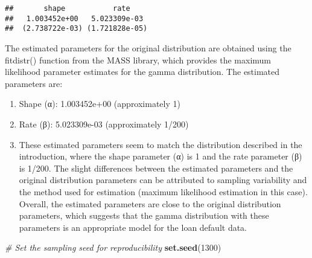 \documentclass[
]{article}
\newenvironment{Shaded}{\begin{snugshade}}{\end{snugshade}}
\newcommand{\AttributeTok}[1]{\textcolor[rgb]{0.13,0.29,0.53}{#1}}
\newcommand{\CommentTok}[1]{\textcolor[rgb]{0.56,0.35,0.01}{\textit{#1}}}
\newcommand{\DecValTok}[1]{\textcolor[rgb]{0.00,0.00,0.81}{#1}}
\newcommand{\FunctionTok}[1]{\textcolor[rgb]{0.13,0.29,0.53}{\textbf{#1}}}
\newcommand{\NormalTok}[1]{#1}
\newcommand{\OtherTok}[1]{\textcolor[rgb]{0.56,0.35,0.01}{#1}}
\newcommand{\SpecialCharTok}[1]{\textcolor[rgb]{0.81,0.36,0.00}{\textbf{#1}}}
\providecommand{\tightlist}{%
  \setlength{\itemsep}{0pt}\setlength{\parskip}{0pt}}
\begin{document}
\begin{verbatim}
##       shape           rate    
##   1.003452e+00   5.023309e-03 
##  (2.738722e-03) (1.721828e-05)
\end{verbatim}

The estimated parameters for the original distribution are obtained
using the fitdistr() function from the MASS library, which provides the
maximum likelihood parameter estimates for the gamma distribution. The
estimated parameters are:

\begin{enumerate}
\def\labelenumi{\arabic{enumi}.}
\tightlist
\item
  Shape (α): 1.003452e+00 (approximately 1)
\item
  Rate (β): 5.023309e-03 (approximately 1/200)
\item
  These estimated parameters seem to match the distribution described in
  the introduction, where the shape parameter (α) is 1 and the rate
  parameter (β) is 1/200. The slight differences between the estimated
  parameters and the original distribution parameters can be attributed
  to sampling variability and the method used for estimation (maximum
  likelihood estimation in this case). Overall, the estimated parameters
  are close to the original distribution parameters, which suggests that
  the gamma distribution with these parameters is an appropriate model
  for the loan default data.
\end{enumerate}

\begin{Shaded}
\begin{Highlighting}[]
\CommentTok{\# Set the sampling seed for reproducibility}
\FunctionTok{set.seed}\NormalTok{(}\DecValTok{1300}\NormalTok{)}
\end{Highlighting}
\end{Shaded}

\begin{Shaded}
\end{Shaded}
\end{document}
